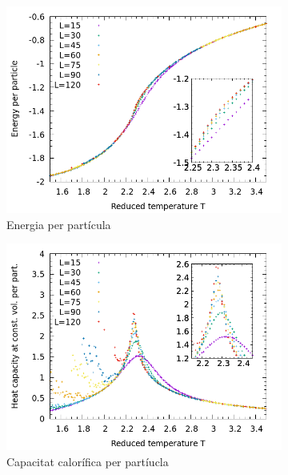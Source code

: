 \documentclass[a4paper]{article}
\begin{document}
\begin{figure}[H]
    \centering
    \begin{subfigure}{.45\textwidth}
        \centering
        \includegraphics[width=\textwidth]{plot-e.png}
        \caption{Energia per partícula}
        \label{fig:plot-e}
    \end{subfigure}
    \begin{subfigure}{.45\textwidth}
        \centering
        \includegraphics[width=\textwidth]{plot-cv.png}
        \caption{Capacitat calorífica per partíucla}
        \label{fig:plot-cv}
    \end{subfigure}
        \begin{subfigure}{.45\textwidth}
        \centering

\end{subfigure}
\end{figure}
\end{document}
